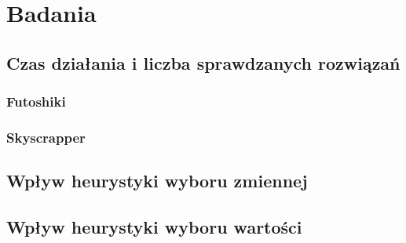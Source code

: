 \documentclass{article}
\begin{document}
	\section{Badania}
	\subsection{Czas działania i liczba sprawdzanych rozwiązań}
	\subsubsection{Futoshiki}
	\subsubsection{Skyscrapper}
	
	\subsection{Wpływ heurystyki wyboru zmiennej}
	\subsection{Wpływ heurystyki wyboru wartości}
\end{document}
